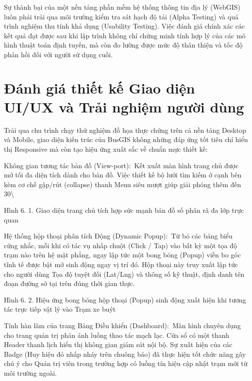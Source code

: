 \documentclass[13pt,a4paper]{report}
\begin{document}
Sự thành bại của một nền tảng phần mềm hệ thống thông tin địa lý (WebGIS) luôn phải trải qua môi trường kiểm tra sát hạch độ tải (Alpha Testing) và quá trình nghiệm thu tính khả dụng (Usability Testing). Việc đánh giá chính xác các kết quả đạt được sau khi lập trình không chỉ chứng minh tính hợp lý của các mô hình thuật toán định tuyến, mà còn đo lường được mức độ thân thiện và tốc độ phản hồi đối với người sử dụng cuối.

\section{Đánh giá thiết kế Giao diện UI/UX và Trải nghiệm người dùng}

Trải qua chu trình chạy thử nghiệm đồ họa thực chứng trên cả nền tảng Desktop và Mobile, giao diện kiến trúc của BusGIS không những đáp ứng tốt tiêu chí hiển thị Responsive mà còn tạo hiệu ứng xuất sắc về chuẩn mực thiết kế:

Không gian tương tác bản đồ (View-port): Kết xuất màn hình trang chủ được mở tối đa diện tích dảnh cho bản đồ. Việc thiết kế bộ lưới tìm kiếm ở cạnh bên kèm cơ chế gập/rút (collapse) thanh Menu siêu mượt giúp giải phóng thêm đến 30\textbackslash{}%

Hình 6. 1. Giao diện trang chủ tích hợp sức mạnh bản đồ số phân rã đa lớp trực quan

Hệ thống hộp thoại phân tích Động (Dynamic Popup): Từ bỏ các bảng biểu cứng nhắc, mỗi khi có tác vụ nhấp chuột (Click / Tap) vào bất kỳ một tọa độ trạm nào trên hệ mặt phẳng, ngay lập tức một bong bóng (Popup) viền bo góc tĩnh tế được bật mở sinh động ngay vị trí đó. Hộp thoại này truy xuất lập tức cho người dùng Tọa độ tuyệt đối (Lat/Lng) và thông số kỹ thuật, định danh tên đoạn đường sở tại trên đúng thời gian thực.

Hình 6. 2. Hiệu ứng bong bóng hộp thoại (Popup) sinh động xuất hiện khi tương tác trực tiếp vật lý vào Trạm xe buýt

Tính hàn lâm của trang Bảng Điều khiển (Dashboard): Màn hình chuyên dụng cho trang quản trị phản ánh luồng thao tác mạch lạc. Cửa sổ có một thanh Header thanh lịch hiển thị không gian giám sát nội bộ. Sự xuất hiện của các Badge (Huy hiệu đỏ nhấp nháy trên chuông báo) đã thực hiện tốt chức năng gây chú ý cho Quản trị viên trong trường hợp có luồng tín hiệu cập nhật trạm mới từ môi trường ngoài.
\end{document}

